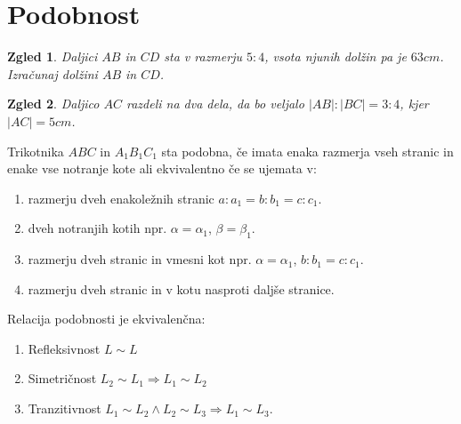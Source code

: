 \documentclass{article}
\newtheorem*{zgled}{Zgled}
\begin{document}
\section{Podobnost}

\begin{zgled}
    Daljici $AB$ in $CD$ sta v razmerju $5:4$, vsota njunih dolžin pa je $63cm$. Izračunaj dolžini $AB$ in $CD$.
\end{zgled}

\begin{zgled}
    Daljico $AC$ razdeli na dva dela, da bo veljalo $|AB|:|BC|=3:4$, kjer $|AC|=5cm$.
\end{zgled}

Trikotnika $ABC$ in $A_1 B_1 C_1$ sta podobna, če imata enaka razmerja vseh stranic in enake vse notranje kote ali ekvivalentno če se ujemata v:
\begin{enumerate}[i]
    \item razmerju dveh enakoležnih stranic $a:a_1 = b:b_1 =c: c_1$.
    \item dveh notranjih kotih npr. $\alpha = \alpha_1$, $\beta =\beta_1$.
    \item razmerju dveh stranic in vmesni kot npr. $\alpha =\alpha_1$, $b:b_1 = c: c_1$.
    \item razmerju dveh stranic in v kotu nasproti daljše stranice.
  \end{enumerate}

  Relacija podobnosti je ekvivalenčna:
  \begin{enumerate}[i]
    \item Refleksivnost $L\sim L$
    \item Simetričnost $L_2\sim L_1 \Rightarrow L_1 \sim L_2$
    \item Tranzitivnost $L_1 \sim L_2 \land L_2 \sim L_3 \Rightarrow L_1 \sim L_3$.
  \end{enumerate}
\end{document}

